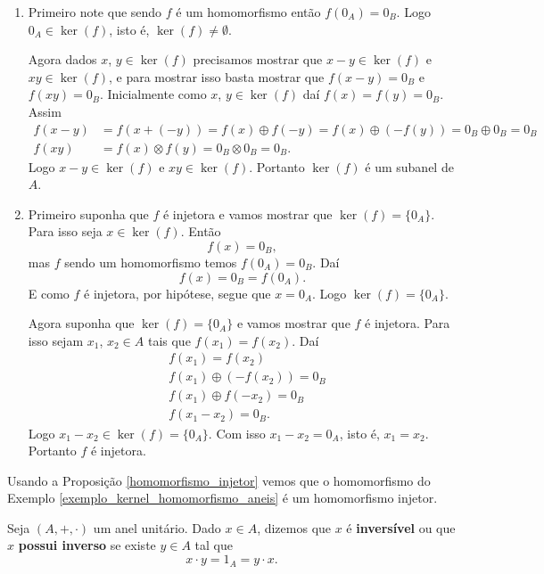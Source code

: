 \begin{prova}
    \begin{enumerate}[label={\roman*})]
        \item Primeiro note que sendo $f$ é um homomorfismo então $f(0_A) = 0_B$. Logo $0_A \in \ker(f)$, isto é, $\ker(f) \ne \emptyset$.

        Agora dados $x$, $y \in \ker(f)$ precisamos mostrar que $x - y \in \ker(f)$ e $xy \in \ker(f)$, e para mostrar isso basta mostrar que $f(x - y) = 0_B$ e$f(xy) = 0_B$.
        Inicialmente como $x$, $y \in \ker(f)$ daí $f(x) = f(y) = 0_B$. Assim
        \begin{align*}
            f(x - y) &= f(x + (-y)) = f(x) \oplus f(-y) = f(x) \oplus (-f(y)) = 0_B \oplus 0_B = 0_B\\
            f(xy) &= f(x)\otimes f(y) = 0_B \otimes 0_B = 0_B.
        \end{align*}
        Logo $x - y \in \ker(f)$ e $xy \in \ker(f)$. Portanto $\ker(f)$ é um subanel de $A$.

        \item Primeiro suponha que $f$ é injetora e vamos mostrar que $\ker(f) = \{0_A\}$. Para isso seja $x \in \ker(f)$. Então
        \[
            f(x) = 0_B,
        \]
        mas $f$ sendo um homomorfismo temos $f(0_A) = 0_B$. Daí
        \[
            f(x) = 0_B = f(0_A).
        \]
        E como $f$ é injetora, por hip\'otese, segue que $x = 0_A$. Logo $\ker(f) = \{0_A\}$.

        Agora suponha que $\ker(f) = \{0_A\}$ e vamos mostrar que $f$ é injetora. Para isso sejam $x_1$, $x_2 \in A$ tais que $f(x_1) = f(x_2)$. Daí
        \begin{align*}
            &f(x_1) = f(x_2)\\
            &f(x_1) \oplus (-f(x_2)) = 0_B\\
            &f(x_1) \oplus f(-x_2) = 0_B\\
            &f(x_1 - x_2) = 0_B.
        \end{align*}
        Logo $x_1 - x_2 \in \ker(f) = \{0_A\}$. Com isso $x_1 - x_2 = 0_A$, isto é, $x_1 = x_2$. Portanto $f$ é injetora.
    \end{enumerate}
\end{prova}

Usando a Proposição \ref{homomorfismo_injetor} vemos que o homomorfismo do Exemplo \ref{exemplo_kernel_homomorfismo_aneis} é um homomorfismo injetor.

\begin{definicao}
    Seja $(A, +, \cdot)$ um anel unitário. Dado $x \in A$, dizemos que $x$ é \textbf{inversível} ou que $x$ \textbf{possui inverso} se existe $y \in A$ tal que
    \[
        x \cdot y = 1_A = y \cdot x.
    \]
\end{definicao}

